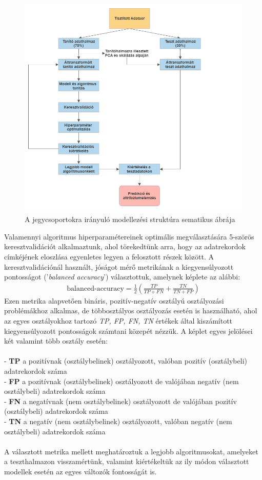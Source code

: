 \documentclass[12pt]{article}
\begin{document}
\begin{figure}[h]
\centering
\includegraphics[scale=0.6]{kepek/flowchart.png}
\caption{A jegycsoportokra irányuló modellezési struktúra sematikus ábrája}
\label{fig:modell}
\end{figure}

\newpage
Valamennyi algoritmus hiperparamétereinek optimális megválasztására 5-szörös keresztvalidációt alkalmaztunk, ahol törekedtünk arra, hogy az adatrekordok címkéjének eloszlása egyenletes legyen a felosztott részek között. A keresztvalidációnál használt, jóságot mérő metrikának a kiegyensúlyozott pontosságot ('\textit{balanced accuracy}') választottuk, amelynek képlete az alábbi:
\begin{align}
\text{balanced-accuracy} = \frac{1}{2}\left(\frac{TP}{TP+FN} + \frac{TN}{TN+FP} \right) 
\end{align}Ezen metrika alapvetően bináris, pozitív-negatív osztályú osztályozási problémákhoz alkalmas, de többosztályos osztályozás esetén is használható, ahol az egyes osztályokhoz tartozó \textit{TP, FP, FN, TN} értékek által kiszámított kiegyensúlyozott pontosságok számtani közepét nézzük. A képlet egyes jelölései két valamint több osztály esetén:  \\ \\
- \textbf{TP} a pozitívnak (osztálybelinek) osztályozott, valóban pozitív (osztálybeli) adatrekordok száma \\
- \textbf{FP} a pozitívnak (osztálybelinek) osztályozott de valójában negatív (nem osztálybeli) adatrekordok száma \\
- \textbf{FN} a negatívnak (nem osztálybelinek) osztályozott de valójában pozitív (osztálybeli) adatrekordok száma \\
- \textbf{TN} a negatív (nem osztálybelinek) osztályozott, valóban negatív (nem osztálybeli) adatrekordok száma \\ 
\\
A választott metrika mellett meghatároztuk a legjobb algoritmusokat, amelyeket a teszthalmazon visszamértünk, valamint kiértékeltük az ily módon választott modellek esetén az egyes változók fontosságát is.
\end{document}
